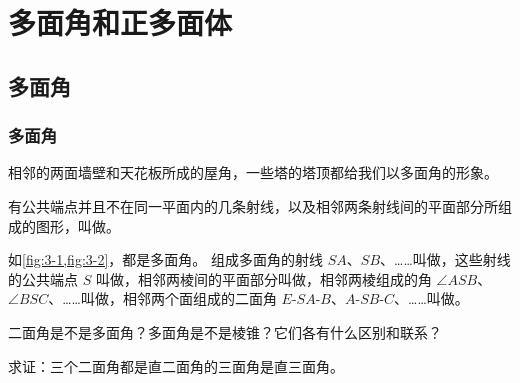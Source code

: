\chapter{多面角和正多面体}
\section{多面角}
\subsection{多面角}
相邻的两面墙壁和天花板所成的屋角，一些塔的塔顶都给我们以多面角的形象。

有公共端点并且不在同一平面内的几条射线，以及相邻两条射线间的平面部分所组成的图形，叫做。

如\cref{fig:3-1,fig:3-2}，都是多面角。
组成多面角的射线 $SA$、$SB$、……叫做，这些射线的公共端点 $S$ 叫做，相邻两棱间的平面部分叫做，相邻两棱组成的角 $\angle ASB$、$\angle BSC$、……叫做，相邻两个面组成的二面角 $E\text{-}SA\text{-}B$、$A\text{-}SB\text{-}C$、……叫做。
\begin{figure}
  \begin{minipage}[b]{0.48\linewidth}\centering
    \caption{}\label{fig:3-1}
  \end{minipage}
  \begin{minipage}[b]{0.48\linewidth}\centering
    \caption{}\label{fig:3-2}
  \end{minipage}
\end{figure}


\begin{Practice}
  \begin{question}
    \item 二面角是不是多面角？多面角是不是棱锥？它们各有什么区别和联系？
    \item 求证：三个二面角都是直二面角的三面角是直三面角。
  \end{question}
\end{Practice}

